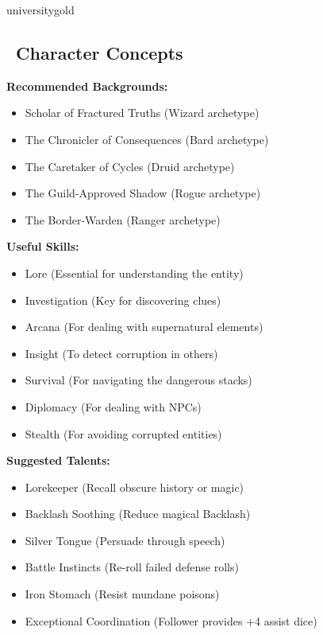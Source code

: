 \documentclass[11pt]{article}
\begin{document}
\newpage

\begin{campaignsection}{universitygold}
\subsection*{\faUser\ Character Concepts}

\textbf{Recommended Backgrounds:}
\begin{itemize}
    \item Scholar of Fractured Truths (Wizard archetype)
    \item The Chronicler of Consequences (Bard archetype)
    \item The Caretaker of Cycles (Druid archetype)
    \item The Guild-Approved Shadow (Rogue archetype)
    \item The Border-Warden (Ranger archetype)
\end{itemize}

\textbf{Useful Skills:}
\begin{itemize}
    \item Lore (Essential for understanding the entity)
    \item Investigation (Key for discovering clues)
    \item Arcana (For dealing with supernatural elements)
    \item Insight (To detect corruption in others)
    \item Survival (For navigating the dangerous stacks)
    \item Diplomacy (For dealing with NPCs)
    \item Stealth (For avoiding corrupted entities)
\end{itemize}

\textbf{Suggested Talents:}
\begin{itemize}
    \item Lorekeeper (Recall obscure history or magic)
    \item Backlash Soothing (Reduce magical Backlash)
    \item Silver Tongue (Persuade through speech)
    \item Battle Instincts (Re-roll failed defense rolls)
    \item Iron Stomach (Resist mundane poisons)
    \item Exceptional Coordination (Follower provides +4 assist dice)
\end{itemize}


\end{campaignsection}
\end{document}
